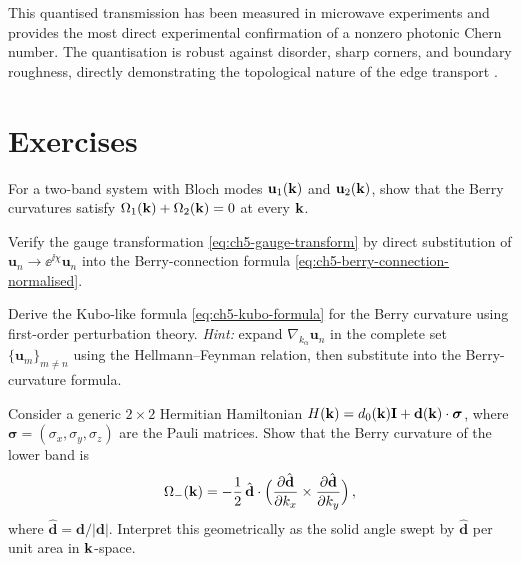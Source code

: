 This quantised transmission has been measured in microwave experiments
\cite{nature2026observation} and provides the most direct experimental
confirmation of a nonzero photonic Chern number.  The quantisation
is robust against disorder, sharp corners, and boundary roughness,
directly demonstrating the topological nature of the edge transport
\cite{hafezi2013imaging,skirlo2015experimental}.

\section*{Exercises}

\begin{exercise}
  For a two-band system with Bloch modes $\mathbf{u}_1(\mathbf{k})$ and
  $\mathbf{u}_2(\mathbf{k})$, show that the Berry curvatures satisfy
  $\Omega_1(\mathbf{k})+\Omega_2(\mathbf{k})=0$ at every $\mathbf{k}$.
\end{exercise}

\begin{exercise}
  Verify the gauge transformation \eqref{eq:ch5-gauge-transform}
  by direct substitution of
  $\mathbf{u}_n\to\ee^{\ii\chi}\mathbf{u}_n$ into the Berry-connection
  formula \eqref{eq:ch5-berry-connection-normalised}.
\end{exercise}

\begin{exercise}
  Derive the Kubo-like formula \eqref{eq:ch5-kubo-formula} for the
  Berry curvature using first-order perturbation theory.
  \emph{Hint:} expand $\nabla_{k_\alpha}\mathbf{u}_n$ in the complete
  set $\{\mathbf{u}_m\}_{m\neq n}$ using the Hellmann--Feynman relation,
  then substitute into the Berry-curvature formula.
\end{exercise}

\begin{exercise}
  Consider a generic $2\times 2$ Hermitian Hamiltonian
  $H(\mathbf{k})=d_0(\mathbf{k})\mathbf{I}+\mathbf{d}(\mathbf{k})\cdot\boldsymbol{\sigma}$,
  where $\boldsymbol{\sigma}=(\sigma_x,\sigma_y,\sigma_z)$ are the
  Pauli matrices.  Show that the Berry curvature of the lower band is
  \begin{equation}
    \Omega_{-}(\mathbf{k}) = -\frac{1}{2}\,
    \hat{\mathbf{d}}\cdot
    \Bigl(\frac{\partial \hat{\mathbf{d}}}{\partial k_x}\times
          \frac{\partial \hat{\mathbf{d}}}{\partial k_y}\Bigr)\,,
  \end{equation}
  where $\hat{\mathbf{d}}=\mathbf{d}/|\mathbf{d}|$.  Interpret this
  geometrically as the solid angle swept by $\hat{\mathbf{d}}$ per
  unit area in $\mathbf{k}$-space.
\end{exercise}

